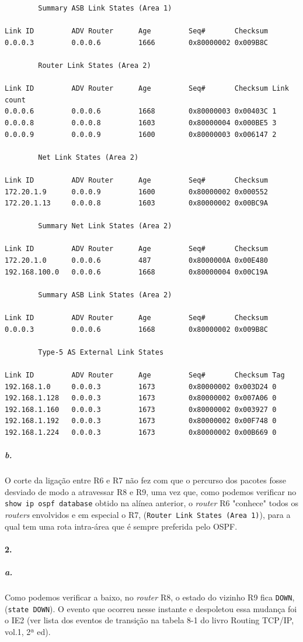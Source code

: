 \begin{verbatim}
		Summary ASB Link States (Area 1)

Link ID         ADV Router      Age         Seq#       Checksum
0.0.0.3         0.0.0.6         1666        0x80000002 0x009B8C

		Router Link States (Area 2)

Link ID         ADV Router      Age         Seq#       Checksum Link count
0.0.0.6         0.0.0.6         1668        0x80000003 0x00403C 1
0.0.0.8         0.0.0.8         1603        0x80000004 0x000BE5 3
0.0.0.9         0.0.0.9         1600        0x80000003 0x006147 2

		Net Link States (Area 2)

Link ID         ADV Router      Age         Seq#       Checksum
172.20.1.9      0.0.0.9         1600        0x80000002 0x000552
172.20.1.13     0.0.0.8         1603        0x80000002 0x00BC9A

		Summary Net Link States (Area 2)

Link ID         ADV Router      Age         Seq#       Checksum
172.20.1.0      0.0.0.6         487         0x8000000A 0x00E480
192.168.100.0   0.0.0.6         1668        0x80000004 0x00C19A

		Summary ASB Link States (Area 2)

Link ID         ADV Router      Age         Seq#       Checksum
0.0.0.3         0.0.0.6         1668        0x80000002 0x009B8C

		Type-5 AS External Link States

Link ID         ADV Router      Age         Seq#       Checksum Tag
192.168.1.0     0.0.0.3         1673        0x80000002 0x003D24 0
192.168.1.128   0.0.0.3         1673        0x80000002 0x007A06 0
192.168.1.160   0.0.0.3         1673        0x80000002 0x003927 0
192.168.1.192   0.0.0.3         1673        0x80000002 0x00F748 0
192.168.1.224   0.0.0.3         1673        0x80000002 0x00B669 0
\end{verbatim}

\subparagraph{b.}
O corte da ligação entre \textsf{R6} e \textsf{R7} não fez com que o percurso dos pacotes fosse desviado de modo a atravessar \textsf{R8} e \textsf{R9}, uma vez que, como podemos verificar no \texttt{show ip ospf database} obtido na alínea anterior, o \emph{router} \textsf{R6} "conhece" todos os \emph{routers} envolvidos e em especial o \textsf{R7}, (\texttt{Router Link States (Area 1)}), para a qual tem uma rota intra-área que é sempre preferida pelo OSPF.

\paragraph{2.}
\subparagraph{a.}
Como podemos verificar a baixo, no \emph{router} \textsf{R8}, o estado do vizinho \textsf{R9} fica \texttt{DOWN}, (\texttt{state DOWN}). O evento que ocorreu nesse instante e despoletou essa mudança foi o IE2 (ver lista dos eventos de transição na tabela 8-1 do livro Routing TCP/IP, vol.1, 2ª ed).

